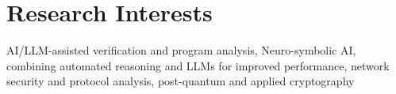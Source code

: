 \section{Research Interests}
\noindent
AI/LLM-assisted verification and program analysis, Neuro-symbolic AI, combining automated reasoning and LLMs for improved performance, network security and protocol analysis, post-quantum and applied cryptography

